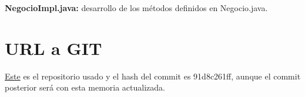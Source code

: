 \documentclass{article}
\begin{document}
\textbf{NegocioImpl.java:} desarrollo de los métodos definidos en Negocio.java.

\section{URL a GIT}

\href{https://github.com/LadyNightmare/ACOES}{Este} es el repositorio usado y el hash del commit es 91d8c261ff, aunque el commit posterior será con esta memoria actualizada.
\end{document}
